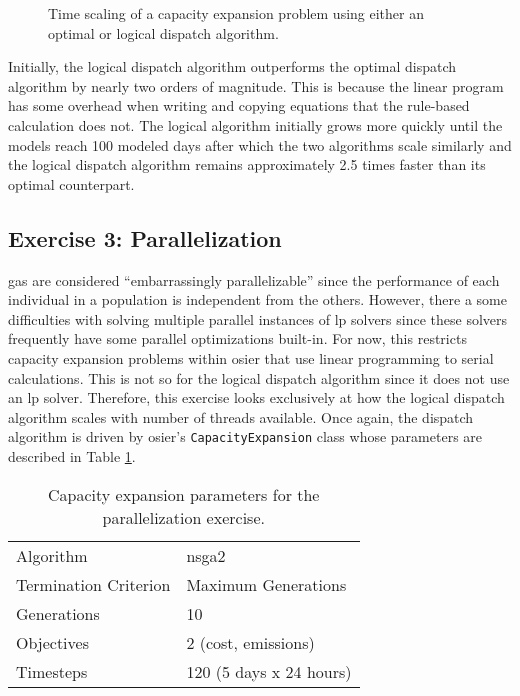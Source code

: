 \begin{figure}[htbp!]
    \centering
    \resizebox{0.75\columnwidth}{!}{}
    \caption{Time scaling of a capacity expansion problem using either an optimal or logical dispatch algorithm.}
    \label{fig:alg-scaling}
\end{figure}

\noindent Initially, the logical dispatch algorithm outperforms the optimal
dispatch algorithm by nearly two orders of magnitude. This is because the linear
program has some overhead when writing and copying equations that the rule-based
calculation does not. The logical algorithm initially grows more quickly until
the models reach 100 modeled days after which the two algorithms scale
similarly and the logical dispatch algorithm remains approximately 2.5 times
faster than its optimal counterpart.

\subsection{Exercise 3: Parallelization}

\Acp{ga} are considered ``embarrassingly parallelizable'' since the performance
of each individual in a population is independent from the others. However, there
a some difficulties with solving multiple parallel instances of \ac{lp} solvers
since these solvers frequently have some parallel optimizations built-in. For
now, this restricts capacity expansion problems within \ac{osier} that use linear 
programming to serial calculations. This is not so for the logical dispatch algorithm 
since it does
not use an \ac{lp} solver. Therefore, this exercise looks exclusively at how the
logical dispatch algorithm scales with number of threads available. Once again,
the dispatch algorithm is driven by \ac{osier}'s \texttt{CapacityExpansion}
class whose parameters are described in Table \ref{tab:thread-scaling-params}. 

\begin{table}[htbp!]
    \centering
    \caption{Capacity expansion parameters for the parallelization exercise.}
    \label{tab:thread-scaling-params}
    \begin{tabular}{ll}
        \toprule
        Algorithm & \acs{nsga2}\\
        Termination Criterion & Maximum Generations\\
        Generations & 10 \\
        Objectives & 2 (cost, emissions)\\
        Timesteps & 120 (5 days x 24 hours)\\
        \bottomrule
    \end{tabular}
\end{table}

